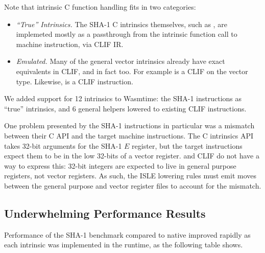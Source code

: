 Note that intrinsic C function handling fits in two categories:
\begin{itemize}
    \item \emph{``True'' Intrinsics.}
        The SHA-1 C intrinsics themselves, such as , are
        implemeted mostly as a passthrough from the intrinsic function call to
        machine instruction, via CLIF IR.
    \item \emph{Emulated.}
        Many of the general vector intrinsics already have exact equivalents in
        CLIF, and in fact \wasm too.  For example  is a CLIF
         on the vector  type.  Likewise,
         is a CLIF  instruction.
\end{itemize}

We added support for 12 intrinsics to Wasmtime: the SHA-1 instructions as
``true'' intrinsics, and 6 general helpers lowered to existing CLIF
instructions.

One problem presented by the SHA-1 instructions in particular was a mismatch
between their C API and the target machine instructions.  The C intrinsics API
takes 32-bit arguments for the SHA-1 $E$ register, but the target instructions
expect them to be in the low 32-bits of a vector register. \wasm and CLIF do not
have a way to express this: 32-bit integers are expected to live in general
purpose registers, not vector registers. As such, the ISLE lowering rules must
emit moves between the general purpose and vector register files to account for
the mismatch.

\subsection{Underwhelming Performance Results}

Performance of the SHA-1 benchmark compared to native improved rapidly as each
intrinsic was implemented in the runtime, as the following table shows.

\newcommand{\changeshaonec}{Intrinsic: \code{vsha1cq\_u32}}
\newcommand{\changeshaonepm}{Intrinsics: \code{vsha1\{p,m\}q\_u32}}
\newcommand{\changeshaoneh}{Intrinsic: \code{vsha1h\_u32}}
\newcommand{\changeshaonesuzero}{Intrinsic: \code{vsha1su0q\_u32}}
\newcommand{\changeshaonesuone}{Intrinsic: \code{vsha1su1q\_u32}}
\newcommand{\changevaddqu}{Intrinsic: \code{vaddq\_u32}}
\newcommand{\changevdupqnu}{Intrinsic: \code{vdupq\_n\_u32}}
\newcommand{\changevgetqlaneu}{Intrinsic: \code{vgetq\_lane\_u32}}
\newcommand{\changevreinterpretq}{Intrinsics: \code{vreinterpretq\_\{u32\_u8,u8\_u32\}}}
\newcommand{\changevrevqu}{Intrinsic: \code{vrev32q\_u8}}


